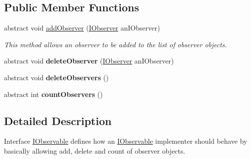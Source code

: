 \subsection*{Public Member Functions}
\begin{DoxyCompactItemize}
\item 
abstract void \hyperlink{interfaceuk_1_1ac_1_1dmu_1_1iesd_1_1cascade_1_1util_1_1_i_observable_acc9c7f4005f0c7efb9669190c4d6d064}{add\-Observer} (\hyperlink{interfaceuk_1_1ac_1_1dmu_1_1iesd_1_1cascade_1_1util_1_1_i_observer}{I\-Observer} an\-I\-Observer)
\begin{DoxyCompactList}\small\item\em This method allows an observer to be added to the list of observer objects. \end{DoxyCompactList}\item 
\hypertarget{interfaceuk_1_1ac_1_1dmu_1_1iesd_1_1cascade_1_1util_1_1_i_observable_ae24a14651bd4afbadb22cd00ec8c32d8}{abstract void {\bfseries delete\-Observer} (\hyperlink{interfaceuk_1_1ac_1_1dmu_1_1iesd_1_1cascade_1_1util_1_1_i_observer}{I\-Observer} an\-I\-Observer)}\label{interfaceuk_1_1ac_1_1dmu_1_1iesd_1_1cascade_1_1util_1_1_i_observable_ae24a14651bd4afbadb22cd00ec8c32d8}

\item 
\hypertarget{interfaceuk_1_1ac_1_1dmu_1_1iesd_1_1cascade_1_1util_1_1_i_observable_ae7c1f237a402679ee861d02f6a4aeedf}{abstract void {\bfseries delete\-Observers} ()}\label{interfaceuk_1_1ac_1_1dmu_1_1iesd_1_1cascade_1_1util_1_1_i_observable_ae7c1f237a402679ee861d02f6a4aeedf}

\item 
\hypertarget{interfaceuk_1_1ac_1_1dmu_1_1iesd_1_1cascade_1_1util_1_1_i_observable_aab284017c31acb507ce11bb13da1416b}{abstract int {\bfseries count\-Observers} ()}\label{interfaceuk_1_1ac_1_1dmu_1_1iesd_1_1cascade_1_1util_1_1_i_observable_aab284017c31acb507ce11bb13da1416b}

\end{DoxyCompactItemize}


\subsection{Detailed Description}
Interface {\ttfamily \hyperlink{interfaceuk_1_1ac_1_1dmu_1_1iesd_1_1cascade_1_1util_1_1_i_observable}{I\-Observable}} defines how an \hyperlink{interfaceuk_1_1ac_1_1dmu_1_1iesd_1_1cascade_1_1util_1_1_i_observable}{I\-Observable} implementer should behave by basically allowing add, delete and count of observer objects. 

